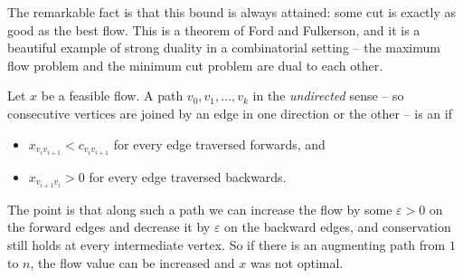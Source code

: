 \documentclass[a4paper]{scrartcl}
\begin{document}
The remarkable fact is that this bound is always attained: some cut is exactly as good as the best flow. This is a theorem of Ford and Fulkerson, and it is a beautiful example of strong duality in a combinatorial setting -- the maximum flow problem and the minimum cut problem are dual to each other.

\begin{definition}
    Let $x$ be a feasible flow. A path $v_0, v_1, \dots, v_k$ in the \emph{undirected} sense -- so consecutive vertices are joined by an edge in one direction or the other -- is an  if
    \begin{itemize}
        \item $x_{v_iv_{i+1}} < c_{v_iv_{i+1}}$ for every edge traversed forwards, and
        \item $x_{v_{i+1}v_i} > 0$ for every edge traversed backwards.
    \end{itemize}
\end{definition}

The point is that along such a path we can increase the flow by some $\varepsilon > 0$ on the forward edges and decrease it by $\varepsilon$ on the backward edges, and conservation still holds at every intermediate vertex. So if there is an augmenting path from $1$ to $n$, the flow value can be increased and $x$ was not optimal.

\begin{center}
\end{center}
\end{document}
